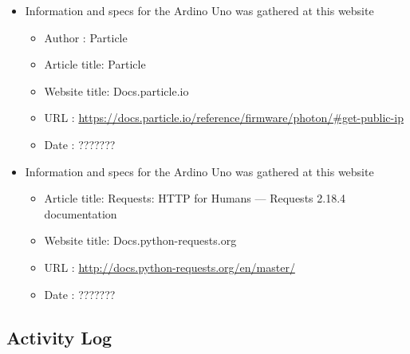 \documentclass{article}
\begin{document}
\begin{thebibliography}{56}
    \begin{itemize}
        \item Information and specs for the Ardino Uno was gathered at this website
        \begin{itemize}
            \item Author       : Particle
            \item Article title: Particle
            \item Website title: Docs.particle.io
            \item URL          : \url{https://docs.particle.io/reference/firmware/photon/#get-public-ip}
            \item Date         : ???????
        \end{itemize}
    \end{itemize}

    \begin{itemize}
        \item Information and specs for the Ardino Uno was gathered at this website
        \begin{itemize}
            \item Article title: Requests: HTTP for Humans — Requests 2.18.4 documentation
            \item Website title: Docs.python-requests.org
            \item URL          : \url{http://docs.python-requests.org/en/master/}
            \item Date         : ???????
        \end{itemize}
    \end{itemize}
\end{thebibliography}

\subsection{Activity Log}
\end{document}
